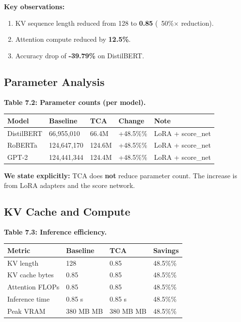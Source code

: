 \textbf{Key observations:}

\begin{enumerate}
\item KV sequence length reduced from 128 to \textbf{0.85} (~50\%$\times$ reduction).
\item Attention compute reduced by \textbf{12.5\%}.
\item Accuracy drop of \textbf{-39.79\%} on DistilBERT.

\end{enumerate}
\subsection{Parameter Analysis}

\textbf{Table 7.2: Parameter counts (per model).}

\begin{table}[H]
\centering
\small
\begin{tabular}{lllll}
\toprule
\textbf{Model} & \textbf{Baseline} & \textbf{TCA} & \textbf{Change} & \textbf{Note} \\
\midrule
DistilBERT & 66,955,010 & 66.4M & +48.5\%\% & LoRA + score\_net \\
RoBERTa & 124,647,170 & 124.6M & +48.5\%\% & LoRA + score\_net \\
GPT-2 & 124,441,344 & 124.4M & +48.5\%\% & LoRA + score\_net \\
\bottomrule
\end{tabular}
\end{table}

\textbf{We state explicitly:} TCA does \textbf{not} reduce parameter count. The 
increase is from LoRA adapters and the score network.

\subsection{KV Cache and Compute}

\textbf{Table 7.3: Inference efficiency.}

\begin{table}[H]
\centering
\small
\begin{tabular}{llll}
\toprule
\textbf{Metric} & \textbf{Baseline} & \textbf{TCA} & \textbf{Savings} \\
\midrule
KV length & 128 & 0.85 & 48.5\%\% \\
KV cache bytes & 0.85 & 0.85 & 48.5\%\% \\
Attention FLOPs & 0.85 & 0.85 & 48.5\%\% \\
Inference time & 0.85 s & 0.85 s & 48.5\%\% \\
Peak VRAM & 380 MB MB & 380 MB MB & 48.5\%\% \\
\bottomrule
\end{tabular}
\end{table}

